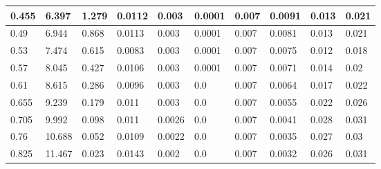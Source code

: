\begin{landscape}
\begin{table}
\begin{tabular}{|p{1cm}|p{1cm}|p{1.5cm}|p{1.5cm}|p{2cm}|p{2cm}|p{1.5cm}|p{1.5cm}|p{2.5cm}|p{2.5cm}|}
		0.455 & 6.397  & 1.279         & 0.0112            & 0.003              & 0.0001               & 0.007              & 0.0091                & 0.013             & 0.021               \\ \hline
		0.49  & 6.944  & 0.868         & 0.0113            & 0.003              & 0.0001               & 0.007              & 0.0081                & 0.013             & 0.021               \\ \hline
		0.53  & 7.474  & 0.615         & 0.0083            & 0.003              & 0.0001               & 0.007              & 0.0075                & 0.012             & 0.018               \\ \hline
		0.57  & 8.045  & 0.427         & 0.0106            & 0.003              & 0.0001               & 0.007              & 0.0071                & 0.014             & 0.02                \\ \hline
		0.61  & 8.615  & 0.286         & 0.0096            & 0.003              & 0.0                  & 0.007              & 0.0064                & 0.017             & 0.022               \\ \hline
		0.655 & 9.239  & 0.179         & 0.011             & 0.003              & 0.0                  & 0.007              & 0.0055                & 0.022             & 0.026               \\ \hline
		0.705 & 9.992  & 0.098         & 0.011             & 0.0026             & 0.0                  & 0.007              & 0.0041                & 0.028             & 0.031               \\ \hline
		0.76  & 10.688 & 0.052         & 0.0109            & 0.0022             & 0.0                  & 0.007              & 0.0035                & 0.027             & 0.03                \\ \hline
		0.825 & 11.467 & 0.023         & 0.0143            & 0.002              & 0.0                  & 0.007              & 0.0032                & 0.026             & 0.031               \\ \hline
	\end{tabular}
	\end{table}
\end{landscape}
\restoregeometry
\pagestyle{plain}